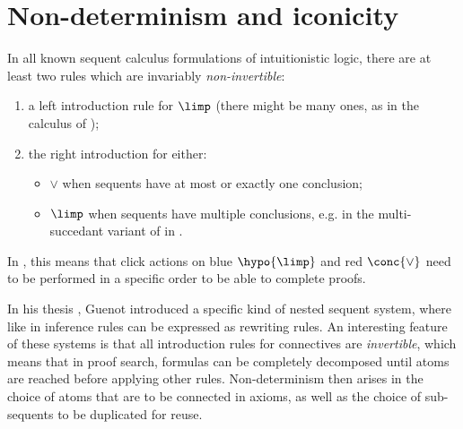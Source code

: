 

\section{Non-determinism and iconicity}

In all known sequent calculus formulations of intuitionistic logic, there are at
least two rules which are invariably \emph{non-invertible}:
\begin{enumerate}
  \item a left introduction rule for $\limp$ (there might be many ones, as in
  the calculus  of );
  \item the right introduction for either:
    \begin{itemize}
      \item $\lor$ when sequents have at most or exactly one conclusion;
      \item $\limp$ when sequents have multiple conclusions, e.g. in the
        multi-succedant variant of  in
        \cite{dyckhoff_contraction-free_1992}.
    \end{itemize}
\end{enumerate}
In , this means that click actions on blue $\hypo{\limp}$ and red
$\conc{\lor}$ need to be performed in a specific order to be able to complete
proofs.

In his thesis \cite{guenot_nested_2013}, Guenot introduced a specific kind of
nested sequent system, where like in  inference rules can be expressed
as rewriting rules. An interesting feature of these systems is that all
introduction rules for connectives are \emph{invertible}, which means that in
proof search, formulas can be completely decomposed until atoms are reached
before applying other rules. Non-determinism then arises in the choice of atoms
that are to be connected in axioms, as well as the choice of sub-sequents to be
duplicated for reuse.

